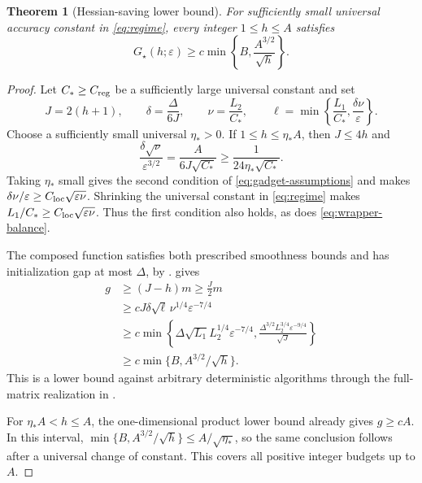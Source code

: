 \documentclass[11pt]{article}
\newtheorem{theorem}{Theorem}[section]
\theoremstyle{remark}
\theoremstyle{remark}
\newcommand{\eps}{\varepsilon}
\newcommand{\G}{G_\star}
\begin{document}
\begin{theorem}[Hessian-saving lower bound]\label{thm:poor-complete}
For sufficiently small universal accuracy constant in \eqref{eq:regime}, every integer $1\le h\le A$ satisfies
\begin{equation}\label{eq:poor-lower-complete}
 \G(h;\eps)\ge c\min\left\{B,\frac{A^{3/2}}{\sqrt h}\right\}.
\end{equation}
\end{theorem}
\begin{proof}
Let $C_*\ge C_{\rm reg}$ be a sufficiently large universal constant and set
\begin{equation}\label{eq:poor-calibration-final}
 J=2(h+1),\qquad \delta=\frac{\Delta}{6J},\qquad
 \nu=\frac{L_2}{C_*},\qquad
 \ell=\min\left\{\frac{L_1}{C_*},\frac{\delta\nu}{\eps}\right\}.
\end{equation}
Choose a sufficiently small universal $\eta_*>0$. If $1\le h\le\eta_*A$, then $J\le4h$ and
\[
 \frac{\delta\sqrt\nu}{\eps^{3/2}}
 =\frac{A}{6J\sqrt{C_*}}\ge\frac{1}{24\eta_*\sqrt{C_*}}.
\]
Taking $\eta_*$ small gives the second condition of \eqref{eq:gadget-assumptions} and makes $\delta\nu/\eps\ge C_{\rm loc}\sqrt{\eps\nu}$. Shrinking the universal constant in \eqref{eq:regime} makes $L_1/C_*\ge C_{\rm loc}\sqrt{\eps\nu}$. Thus the first condition also holds, as does \eqref{eq:wrapper-balance}.

The composed function satisfies both prescribed smoothness bounds and has initialization gap at most $\Delta$, by .  gives
\begin{align*}
 g&\ge(J-h)m\ge\frac J2m\\
 &\ge cJ\delta\sqrt\ell\,\nu^{1/4}\eps^{-7/4}\\
 &\ge c\min\left\{
 \Delta\sqrt{L_1}L_2^{1/4}\eps^{-7/4},
 \frac{\Delta^{3/2}L_2^{3/4}\eps^{-9/4}}{\sqrt J}
 \right\}\\
 &\ge c\min\{B,A^{3/2}/\sqrt h\}.
\end{align*}
This is a lower bound against arbitrary deterministic algorithms through the full-matrix realization in .

For $\eta_*A<h\le A$, the one-dimensional product lower bound already gives $g\ge cA$. In this interval,
$\min\{B,A^{3/2}/\sqrt h\}\le A/\sqrt{\eta_*}$, so the same conclusion follows after a universal change of constant. This covers all positive integer budgets up to $A$.
\end{proof}
\end{document}
